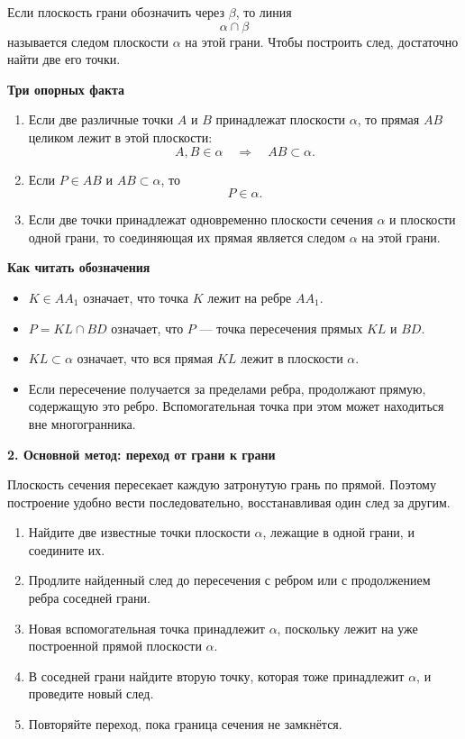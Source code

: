 \documentclass[a4paper,12pt]{article}
\newcommand{\sectitle}[1]{%
  \vspace{0.55em}%
  {\Large\bfseries\color{darkaccent}#1\par}%
  \vspace{0.2em}%
  \noindent{\color{accent}\rule{\linewidth}{0.8pt}}%
  \vspace{0.45em}%
}
\newcommand{\subtopic}[1]{%
  \vspace{0.4em}%
  {\large\bfseries\color{darkaccent}#1\par}%
  \vspace{0.15em}%
}
\begin{document}
Если плоскость грани обозначить через $\beta$, то линия
\[
  \alpha\cap\beta
\]
называется следом плоскости $\alpha$ на этой грани. Чтобы построить след, достаточно найти две его точки.

\subtopic{Три опорных факта}

\begin{enumerate}
  \item Если две различные точки $A$ и $B$ принадлежат плоскости $\alpha$, то прямая $AB$ целиком лежит в этой плоскости:
  \[
    A,B\in\alpha
    \quad\Longrightarrow\quad
    AB\subset\alpha.
  \]

  \item Если $P\in AB$ и $AB\subset\alpha$, то
  \[
    P\in\alpha.
  \]

  \item Если две точки принадлежат одновременно плоскости сечения $\alpha$ и плоскости одной грани, то соединяющая их прямая является следом $\alpha$ на этой грани.
\end{enumerate}

\subtopic{Как читать обозначения}

\begin{itemize}
  \item $K\in AA_1$ означает, что точка $K$ лежит на ребре $AA_1$.
  \item $P=KL\cap BD$ означает, что $P$ --- точка пересечения прямых $KL$ и $BD$.
  \item $KL\subset\alpha$ означает, что вся прямая $KL$ лежит в плоскости $\alpha$.
  \item Если пересечение получается за пределами ребра, продолжают прямую, содержащую это ребро. Вспомогательная точка при этом может находиться вне многогранника.
\end{itemize}

\sectitle{2. Основной метод: переход от грани к грани}

Плоскость сечения пересекает каждую затронутую грань по прямой. Поэтому построение удобно вести последовательно, восстанавливая один след за другим.

\begin{enumerate}
  \item Найдите две известные точки плоскости $\alpha$, лежащие в одной грани, и соедините их.
  \item Продлите найденный след до пересечения с ребром или с продолжением ребра соседней грани.
  \item Новая вспомогательная точка принадлежит $\alpha$, поскольку лежит на уже построенной прямой плоскости $\alpha$.
  \item В соседней грани найдите вторую точку, которая тоже принадлежит $\alpha$, и проведите новый след.
  \item Повторяйте переход, пока граница сечения не замкнётся.
\end{enumerate}
\end{document}
